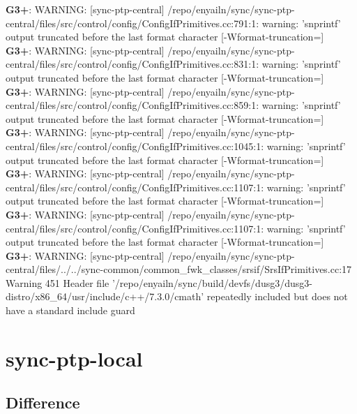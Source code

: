 \documentclass[12pt,twoside]{article}
\begin{document}
\textbf{G3+}: WARNING: [sync-ptp-central] /repo/enyailn/sync/sync-ptp-central/files/src/control/config/ConfigIfPrimitives.cc:791:1: warning: 'snprintf' output truncated before the last format character [-Wformat-truncation=]\\ 
\textbf{G3+}: WARNING: [sync-ptp-central] /repo/enyailn/sync/sync-ptp-central/files/src/control/config/ConfigIfPrimitives.cc:831:1: warning: 'snprintf' output truncated before the last format character [-Wformat-truncation=]\\ 
\textbf{G3+}: WARNING: [sync-ptp-central] /repo/enyailn/sync/sync-ptp-central/files/src/control/config/ConfigIfPrimitives.cc:859:1: warning: 'snprintf' output truncated before the last format character [-Wformat-truncation=]\\ 
\textbf{G3+}: WARNING: [sync-ptp-central] /repo/enyailn/sync/sync-ptp-central/files/src/control/config/ConfigIfPrimitives.cc:1045:1: warning: 'snprintf' output truncated before the last format character [-Wformat-truncation=]\\ 
\textbf{G3+}: WARNING: [sync-ptp-central] /repo/enyailn/sync/sync-ptp-central/files/src/control/config/ConfigIfPrimitives.cc:1107:1: warning: 'snprintf' output truncated before the last format character [-Wformat-truncation=]\\ 
\textbf{G3+}: WARNING: [sync-ptp-central] /repo/enyailn/sync/sync-ptp-central/files/src/control/config/ConfigIfPrimitives.cc:1107:1: warning: 'snprintf' output truncated before the last format character [-Wformat-truncation=]\\ 
\textbf{G3+}: WARNING: [sync-ptp-central] /repo/enyailn/sync/sync-ptp-central/files/../../sync-common/common\_fwk\_classes/srsif/SrsIfPrimitives.cc:17 Warning 451 Header file '/repo/enyailn/sync/build/devfs/dusg3/dusg3-distro/x86\_64/usr/include/c++/7.3.0/cmath' repeatedly included but does not have a standard include guard\\ 
  
\section{sync-ptp-local} 
\subsection{Difference} 
  
\end{document}
